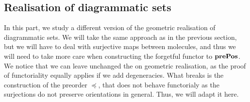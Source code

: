 \subsection{Realisation of diagrammatic sets}

In this part, we study a different version of the geometric realisation of diagrammatic sets. We will take the same approach as in the previous section, but we will have to deal with surjective maps between molecules, and thus we will need to take more care when constructing the forgetful functor to \( \mathbf{prePos} \). We notice that we can leave unchanged the  on geometric realisation, as the proof of functoriality equally applies if we add degeneracies. What breaks is the construction of the preorder \( \preceq \), that does not behave functorialy as the surjections do not preserve orientations in general. Thus, we will adapt it here. 

